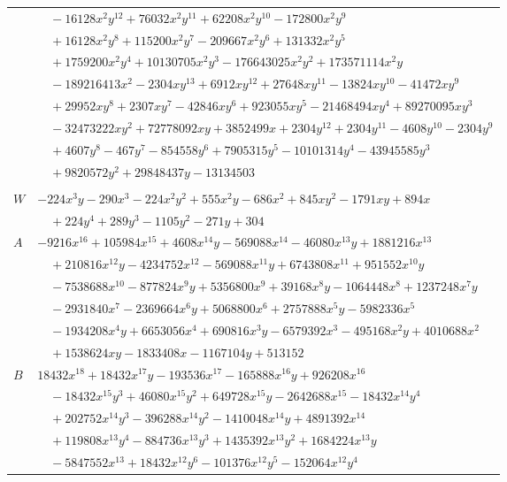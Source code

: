 \documentclass[11pt]{article}
\begin{document}
\begin{longtable}{@{}ll@{}}
 & $\quad -16128x^{2}y^{12}+76032x^{2}y^{11}+62208x^{2}y^{10}-172800x^{2}y^{9}$\\
 & $\quad +16128x^{2}y^{8}+115200x^{2}y^{7}-209667x^{2}y^{6}+131332x^{2}y^{5}$\\
 & $\quad +1759200x^{2}y^{4}+10130705x^{2}y^{3}-176643025x^{2}y^{2}+173571114x^{2}y$\\
 & $\quad -189216413x^{2}-2304xy^{13}+6912xy^{12}+27648xy^{11}-13824xy^{10}-41472xy^{9}$\\
 & $\quad +29952xy^{8}+2307xy^{7}-42846xy^{6}+923055xy^{5}-21468494xy^{4}+89270095xy^{3}$\\
 & $\quad -32473222xy^{2}+72778092xy+3852499x+2304y^{12}+2304y^{11}-4608y^{10}-2304y^{9}$\\
 & $\quad +4607y^{8}-467y^{7}-854558y^{6}+7905315y^{5}-10101314y^{4}-43945585y^{3}$\\
 & $\quad +9820572y^{2}+29848437y-13134503$\\
\addlinespace[3pt]
\multicolumn{2}{@{}l}{$i=5$, $m=24$, neighbours $0,7,22,23,26,28,30,47,57,70,80,81,90$}\\
$W$ & $-224x^{3}y-290x^{3}-224x^{2}y^{2}+555x^{2}y-686x^{2}+845xy^{2}-1791xy+894x$\\
 & $\quad +224y^{4}+289y^{3}-1105y^{2}-271y+304$\\
$A$ & $-9216x^{16}+105984x^{15}+4608x^{14}y-569088x^{14}-46080x^{13}y+1881216x^{13}$\\
 & $\quad +210816x^{12}y-4234752x^{12}-569088x^{11}y+6743808x^{11}+951552x^{10}y$\\
 & $\quad -7538688x^{10}-877824x^{9}y+5356800x^{9}+39168x^{8}y-1064448x^{8}+1237248x^{7}y$\\
 & $\quad -2931840x^{7}-2369664x^{6}y+5068800x^{6}+2757888x^{5}y-5982336x^{5}$\\
 & $\quad -1934208x^{4}y+6653056x^{4}+690816x^{3}y-6579392x^{3}-495168x^{2}y+4010688x^{2}$\\
 & $\quad +1538624xy-1833408x-1167104y+513152$\\
$B$ & $18432x^{18}+18432x^{17}y-193536x^{17}-165888x^{16}y+926208x^{16}$\\
 & $\quad -18432x^{15}y^{3}+46080x^{15}y^{2}+649728x^{15}y-2642688x^{15}-18432x^{14}y^{4}$\\
 & $\quad +202752x^{14}y^{3}-396288x^{14}y^{2}-1410048x^{14}y+4891392x^{14}$\\
 & $\quad +119808x^{13}y^{4}-884736x^{13}y^{3}+1435392x^{13}y^{2}+1684224x^{13}y$\\
 & $\quad -5847552x^{13}+18432x^{12}y^{6}-101376x^{12}y^{5}-152064x^{12}y^{4}$\\

\end{longtable}
\end{document}

